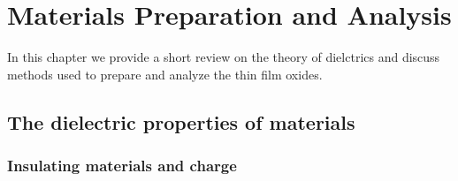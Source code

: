 \chapter{Materials Preparation and Analysis}

In this chapter we provide a short review on the theory of dielctrics and discuss methods used to prepare and analyze the thin film oxides. 

\section{The dielectric properties of materials}
\subsection{Insulating materials and charge}

